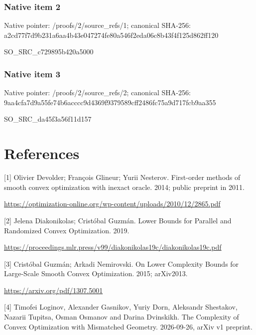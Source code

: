 \documentclass[10pt,a4paper]{article}
\begin{document}
\subsubsection{Native item 2}


Native pointer: /proofs/2/source\_refs/1; canonical SHA-256: a2cd77f7d9b231a6aa4b43e0\allowbreak{}47274fe80a546f2eda06c8b4\allowbreak{}3f4f125d862ff120


SO\_SRC\_c729895b420a5000


\subsubsection{Native item 3}


Native pointer: /proofs/2/source\_refs/2; canonical SHA-256: 9aa4cfa7d9a55fe74b6acccc\allowbreak{}9d4369f9379589cff2486fc7\allowbreak{}5a9d717fcb9aa355


SO\_SRC\_da45f3a56f11d157


\section{References}


[1] Olivier Devolder; François Glineur; Yurii Nesterov. First-order methods of smooth convex optimization with inexact oracle. 2014; public preprint in 2011.



\url{https://optimization-online.org/wp-content/uploads/2010/12/2865.pdf}



[2] Jelena Diakonikolas; Cristóbal Guzmán. Lower Bounds for Parallel and Randomized Convex Optimization. 2019.



\url{https://proceedings.mlr.press/v99/diakonikolas19c/diakonikolas19c.pdf}



[3] Cristóbal Guzmán; Arkadi Nemirovski. On Lower Complexity Bounds for Large-Scale Smooth Convex Optimization. 2015; arXiv2013.



\url{https://arxiv.org/pdf/1307.5001}



[4] Timofei Loginov, Alexander Gasnikov, Yuriy Dorn, Aleksandr Shestakov, Nazarii Tupitsa, Osman Osmanov and Darina Dvinskikh. The Complexity of Convex Optimization with Mismatched Geometry. 2026-09-26, arXiv v1 preprint.
\end{document}
